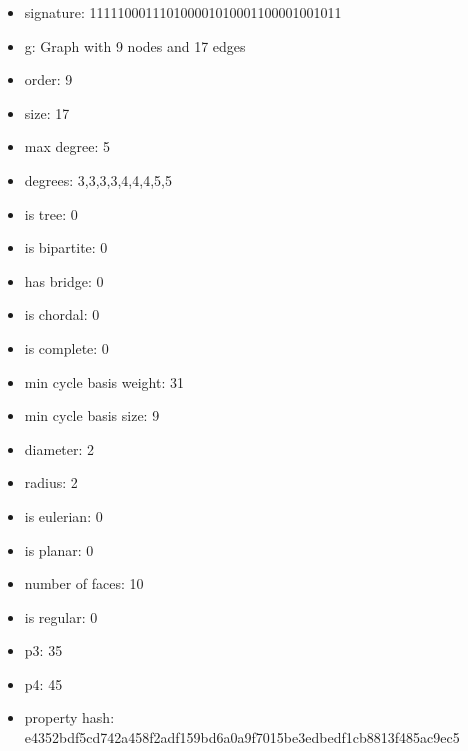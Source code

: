 \newpage
\begin{figure}
\end{figure}
\begin{itemize}
\item signature: 111110001110100001010001100001001011
\item g: Graph with 9 nodes and 17 edges
\item order: 9
\item size: 17
\item max degree: 5
\item degrees: 3,3,3,3,4,4,4,5,5
\item is tree: 0
\item is bipartite: 0
\item has bridge: 0
\item is chordal: 0
\item is complete: 0
\item min cycle basis weight: 31
\item min cycle basis size: 9
\item diameter: 2
\item radius: 2
\item is eulerian: 0
\item is planar: 0
\item number of faces: 10
\item is regular: 0
\item p3: 35
\item p4: 45
\item property hash: e4352bdf5cd742a458f2adf159bd6a0a9f7015be3edbedf1cb8813f485ac9ec5
\end{itemize}
